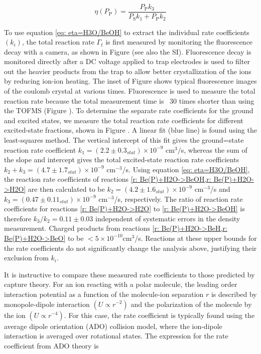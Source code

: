 \begin{equation}
	\eta(P_\text{P}) = \frac{P_\text{P} k_3}{P_\text{S} k_1 + P_\text{P} k_2} \label{eq: eta=H3O/BeOH}
\end{equation}

To use equation \ref{eq: eta=H3O/BeOH} to extract the individual rate coefficients $(k_i)$, the total reaction rate $\Gamma_t$ is first measured by monitoring the  fluorescence decay with a camera, as shown in Figure  (see also the SI). Fluorescence decay is monitored directly after a DC voltage applied to trap electrodes is used to filter out the heavier products from the trap to allow better crystallization of the  ions by reducing ion-ion heating.\cite{Chen2013} The inset of Figure  shows typical fluorescence images of the  coulomb crystal at various times. Fluorescence is used to measure the total reaction rate because the total measurement time is ~30 times shorter than using the TOFMS (Figure ). To determine the separate rate coefficients for the  ground and excited states, we measure the total reaction rate coefficients for different excited-state fractions, shown in Figure . A linear fit (blue line) is found using the least-squares method. The vertical intercept of this fit gives the  ground=state reaction rate coefficient $k_1=(2.2 \pm 0.3_{stat}) \times 10^{-9}$ cm$^3/$s, whereas the sum of the slope and intercept gives the total excited-state  reaction rate coefficients $k_2 + k_3 = (4.7 \pm 1.7_{stat}) \times 10^{-9}$ cm$^{-3}$/s. Using equation \ref{eq: eta=H3O/BeOH}, the reaction rate coefficients of reactions \cref{r: Be(P)+H2O->BeOH,r: Be(P)+H2O->H2O} are then calculated to be $k_2 = (4.2 \pm 1.6_{stat}) \times 10^{-9}$ cm$^{-3}$/s and $k_3 = (0.47 \pm 0.11_{stat}) \times 10^{-9}$ cm$^{-3}$/s, respectively. The ratio of reaction rate coefficients for reactions \cref{r: Be(P)+H2O->H2O} to \cref{r: Be(P)+H2O->BeOH} is therefore $k_3/k_2 = 0.11 \pm 0.03$ independent of systematic errors in the density measurement. Charged products from reactions \cref{r: Be(P)+H2O->BeH,r: Be(P)+H2O->BeO} to be $<5\times10^{-10}$cm$^3$/s. Reactions at these upper bounds for the rate coefficients do not significantly change the analysis above, justifying their exclusion from $k_i$.

It is instructive to compare these measured rate coefficients to those predicted by capture theory. For an ion reacting with a polar molecule, the leading order interaction potential as a function of the molecule-ion separation $r$ is described by monopole-dipole interaction $(U \propto r^{-2})$ and the polarization of the molecule by the ion $(U \propto r^{-4})$. For this case, the rate coefficient is typically found using the average dipole orientation (ADO) collision model,\cite{Su1973} where the ion-dipole interaction is averaged over rotational states. The expression for the rate coefficient from ADO theory is

